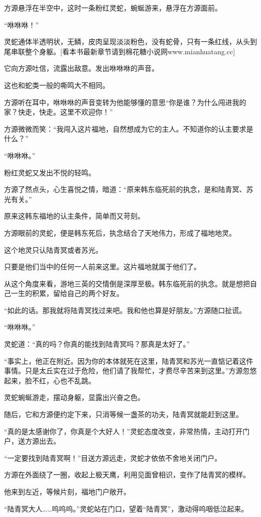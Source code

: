 \begin{this_body}
方源悬浮在半空中，这时一条粉红灵蛇，蜿蜒游来，悬浮在方源面前。

“咻咻咻！”

灵蛇通体半透明状，无鳞，皮肉呈现淡淡粉色，没有蛇骨，只有一条红线，从头到尾串联整个身躯。[看本书最新章节请到棉花糖小说网www.mianhuatang.cc]

它向方源吐信，流露出敌意。发出咻咻咻的声音。

这也和蛇类一般的嘶鸣大不相同。

方源听在耳中，咻咻咻的声音变转为他能够懂的意思“你是谁？为什么闯进我的家？快走，快走。这里不欢迎你！”

方源微微而笑：“我闯入这片福地，自然想成为它的主人。不知道你的认主要求是什么？”

“咻咻咻。”

粉红灵蛇又发出不悦的轻鸣。

方源了然点头，心生喜悦之情，暗道：“原来韩东临死前的执念，是和陆青冥、苏光有关。”

原来这韩东福地的认主条件，简单而又苛刻。

方源眼前的灵蛇，便是韩东死后，执念结合了天地伟力，形成了福地地灵。

这个地灵只认陆青冥或者苏光。

只要是他们当中的任何一人前来这里。这片福地就属于他们了。

从这个角度来看，游地三英的交情倒是深厚至极。韩东临死前的执念。就是想把自己一生的积累，留给自己的两个好友。

“如此的话。那我就将陆青冥找过来吧。我和他也算是好朋友。”方源随口扯谎。

“咻咻咻。”

灵蛇道：“真的吗？你真的能找到陆青冥吗？那真是太好了。”

“事实上，他正在附近。因为你的本体就死在这里，陆青冥和苏光一直惦记着这件事情。只是太丘实在过于危险，他们请了我帮忙，才费尽辛苦来到这里。”方源忽悠起来，脸不红，心也不乱跳。

灵蛇蜿蜒游走，摆动身躯，显露出兴奋之色。

随后，它和方源便约定下来，只消等候一盏茶的功夫，陆青冥就能赶到这里。

“真的是太感谢你了，你真是个大好人！”灵蛇态度改变，非常热情，主动打开门户，送方源出去。

“一定要找到陆青冥啊！”目送方源远走，灵蛇才依依不舍地关闭门户。

方源在外面绕了一圈，收起上极天鹰，利用见面曾相识，变作了陆青冥的模样。

他来到左近，等候片刻，福地门户敞开。

“陆青冥大人……呜呜呜。”灵蛇站在门口，望着“陆青冥”，激动得呜咽低泣起来。


\end{this_body}

